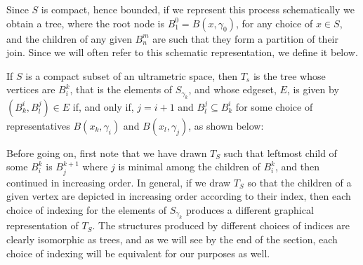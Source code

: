 Since $S$ is compact, hence bounded, if we represent this process schematically we obtain a tree, where the root node is $B^0_1=B(x,\gamma_0)$, for any choice of $x \in S$, and the children of any given $B^m_n$ are such that they form a partition of their join.  Since we will often refer to this schematic representation, we define it below.

\begin{definition*}
If $S$ is a compact subset of an ultrametric space, then $T_s$ is the tree whose vertices are $B^k_i$, that is the elements of $S_{\gamma_k}$, and whose edgeset, $E$, is given by $ (B^i_k, B^j_l) \in E$ if, and only if, $ j = i+1$ and $B^j_l \subseteq B^i_k$ for some choice of representatives $B(x_k,\gamma_i)$ and $B(x_l, \gamma_j)$, as shown below:\\

\tikzset{font=\small,
level distance=1.75cm,
}

\begin{center}
\end{center}
\end{definition*}

Before going on, first note that we have drawn $T_S$ such that leftmost child of some $B^k_i$ is $B^{k+1}_j$ where $j$ is minimal among the children of $B^k_i$, and then continued in increasing order. In general, if we draw $T_S$ so that the children of a given vertex are depicted in increasing order according to their index, then  each choice of indexing for the elements of $S_{\gamma_k}$ produces a different graphical representation of $T_S$. The structures produced by different choices of indices are clearly isomorphic as trees, and as we will see by the end of the section, each choice of indexing will be equivalent for our purposes as well.\\

